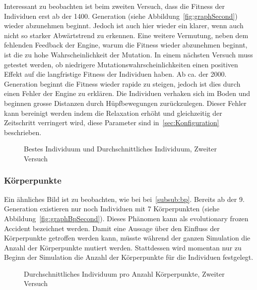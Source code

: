       Interessant zu beobachten ist beim zweiten Versuch,
      dass die Fitness der Individuen erst ab der 1400\@. Generation (siehe Abbildung~\vref{fig:graphSecond})
      wieder abzunehmen beginnt.
      Jedoch ist auch hier wieder ein klarer, wenn auch nicht so starker Abwärtstrend zu erkennen.
      Eine weitere Vermutung, neben dem fehlenden Feedback der Engine, warum die Fitness wieder abzunehmen beginnt,
      ist die zu hohe Wahrscheinlichkeit der Mutation.
      In einem nächsten Versuch muss getestet werden,
      ob niedrigere Mutationswahrscheinlichkeiten einen positiven Effekt auf die langfristige Fitness der Individuen haben.
      Ab ca\@. der 2000\@. Generation beginnt die Fitness wieder rapide zu steigen,
      jedoch ist dies durch einen Fehler der Engine zu erklären.
      Die Individuen verhaken sich im Boden und beginnen grosse Distanzen durch Hüpfbewegungen zurückzulegen.
      Dieser Fehler kann bereinigt werden indem die Relaxation erhöht und gleichzeitig der Zeitschritt verringert wird,
      diese Parameter sind in~\vref{sec:Konfiguration} beschrieben.

      \begin{figure}
        \centering
        
        \caption{Bestes Individuum und Durchschnittliches Individuum, Zweiter Versuch\label{fig:graphSecond}}
      \end{figure}

      \subsubsection{Körperpunkte\label{subsub:bpScnd}}

        Ein ähnliches Bild ist zu beobachten, wie bei bei~\vref{subsub:bp}.
        Bereits ab der 9\@. Generation existieren nur noch Individuen mit 7 Körperpunkten (siehe Abbildung~\vref{fig:graphBpSecond}).
        Dieses Phänomen kann als evolutionary frozen Accident bezeichnet werden.
        Damit eine Aussage über den Einfluss der Körperpunkte getroffen werden kann,
        müsste während der ganzen Simulation die Anzahl der Körperpunkte mutiert werden.
        Stattdessen wird momentan nur zu Beginn der Simulation die Anzahl der Körperpunkte für die Individuen festgelegt.

        \begin{figure}
          \centering
          
          \caption{Durchschnittliches Individuum pro Anzahl Körperpunkte, Zweiter Versuch\label{fig:graphBpSecond}}
        \end{figure}

